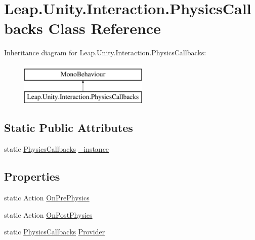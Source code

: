 \hypertarget{class_leap_1_1_unity_1_1_interaction_1_1_physics_callbacks}{}\section{Leap.\+Unity.\+Interaction.\+Physics\+Callbacks Class Reference}
\label{class_leap_1_1_unity_1_1_interaction_1_1_physics_callbacks}
Inheritance diagram for Leap.\+Unity.\+Interaction.\+Physics\+Callbacks\+:\begin{figure}[H]
\begin{center}
\leavevmode
\includegraphics[height=2.000000cm]{class_leap_1_1_unity_1_1_interaction_1_1_physics_callbacks}
\end{center}
\end{figure}
\subsection*{Static Public Attributes}
\begin{DoxyCompactItemize}
\item 
static \mbox{\hyperlink{class_leap_1_1_unity_1_1_interaction_1_1_physics_callbacks}{Physics\+Callbacks}} \mbox{\hyperlink{class_leap_1_1_unity_1_1_interaction_1_1_physics_callbacks_abba1a216756f669133897a7db09dbefc}{\+\_\+instance}}
\end{DoxyCompactItemize}
\subsection*{Properties}
\begin{DoxyCompactItemize}
\item 
static Action \mbox{\hyperlink{class_leap_1_1_unity_1_1_interaction_1_1_physics_callbacks_a9555d4e89cbdac16aec738e76b3b7676}{On\+Pre\+Physics}}
\item 
static Action \mbox{\hyperlink{class_leap_1_1_unity_1_1_interaction_1_1_physics_callbacks_a2cd49a878de846df442e1e81d33a110d}{On\+Post\+Physics}}
\item 
static \mbox{\hyperlink{class_leap_1_1_unity_1_1_interaction_1_1_physics_callbacks}{Physics\+Callbacks}} \mbox{\hyperlink{class_leap_1_1_unity_1_1_interaction_1_1_physics_callbacks_ac953c36688d7cf97ddbe9674411c3e1b}{Provider}}
\end{DoxyCompactItemize}


